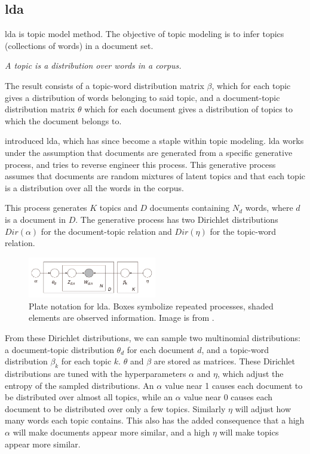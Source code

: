 \subsection{\acrlong{lda}}\label{sec:lda}
\Gls{lda} is topic model method.
The objective of topic modeling is to infer topics (collections of words) in a document set.

\begin{definition}\label{def:topic}
	\textit{A topic is a distribution over words in a corpus.}
\end{definition}

The result consists of a topic-word distribution matrix $\beta$, which for each topic gives a distribution of words belonging to said topic, and a document-topic distribution matrix $\theta$ which for each document gives a distribution of topics to which the document belongs to.

\citeauthor{lda} \cite{lda} introduced \gls{lda}, which has since become a staple within topic modeling.
\gls{lda} works under the assumption that documents are generated from a specific generative process, and tries to reverse engineer this process.
This generative process assumes that documents are random mixtures of latent topics and that each topic is a distribution over all the words in the corpus.

This process generates $K$ topics and $D$ documents containing $N_{d}$ words, where $d$ is a document in $D$.
The generative process has two Dirichlet distributions $Dir(\alpha)$ for the document-topic relation and $Dir(\eta)$ for the topic-word relation.

\begin{figure}[h]
	\centering
	\includegraphics[width=0.5\textwidth]{figures/Smoothed_LDA.jpg}
	\caption{Plate notation for \gls{lda}. Boxes symbolize repeated processes, shaded elements are observed information. Image is from \citet{blei2012topicmodels}.}
	\label{fig:lda}
\end{figure}

From these Dirichlet distributions, we can sample two multinomial distributions: a document-topic distribution $\theta_d$ for each document $d$, and a topic-word distribution $\beta_k$ for each topic $k$.
$\theta$ and $\beta$ are stored as matrices.
These Dirichlet distributions are tuned with the hyperparameters $\alpha$ and $\eta$, which adjust the entropy of the sampled distributions.
An $\alpha$ value near 1 causes each document to be distributed over almost all topics, while an $\alpha$ value near 0 causes each document to be distributed over only a few topics.
Similarly $\eta$ will adjust how many words each topic contains.
This also has the added consequence that a high $\alpha$ will make documents appear more similar, and a high $\eta$ will make topics appear more similar.

